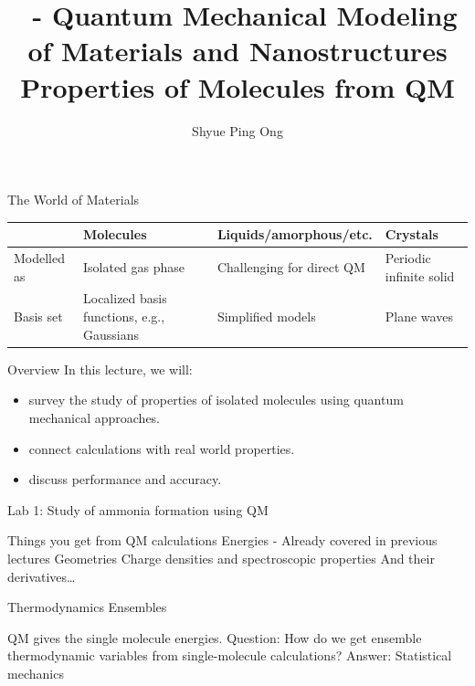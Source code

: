 \documentclass[aspectratio=169]{beamer}
\title[\classname Properties of Molecules from QM]{\classname~- Quantum Mechanical Modeling of Materials and Nanostructures\\Properties of Molecules from QM}
\author{Shyue Ping Ong}
\institute[UCSD]{University of California, San Diego\\
\medskip
}
\date{\classyear} %
\begin{document}
\begin{frame}
    \titlepage %
\end{frame}


\begin{frame}{The World of Materials}

\begin{table}[]
    \centering
    \begin{tabular}{p{2cm}|p{3cm}|p{4cm}|p{3cm}}
        & Molecules & Liquids/amorphous/etc. & Crystals \\
        \hline
        \hline
        Modelled as & Isolated gas phase & Challenging for direct QM & Periodic infinite solid\\
        Basis set & Localized basis functions, e.g., Gaussians & Simplified models & Plane waves
    \end{tabular}
\end{table}
\end{frame} 

\begin{frame}{Overview}
In this lecture, we will:
\begin{itemize}
    \item survey the study of properties of isolated molecules using quantum mechanical approaches.
    \item connect calculations with real world properties.
    \item discuss performance and accuracy.
\end{itemize}

Lab 1: Study of ammonia formation using QM

\end{frame} 


\begin{frame}{Things you get from QM calculations}
Energies - Already covered in previous lectures\newline
\newline
Geometries\newline
\newline
Charge densities and spectroscopic properties\newline
\newline
And their derivatives…
\end{frame} 


\begin{frame}{Thermodynamics Ensembles}

QM gives the single molecule energies.\newline
\newline
Question: How do we get ensemble thermodynamic variables from single-molecule calculations?\newline 
\newline
Answer: Statistical mechanics

\end{frame}
\end{document}
